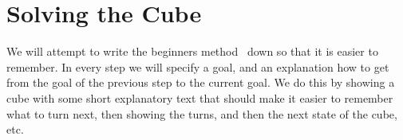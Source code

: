 \chapter{Solving the Cube}
We will attempt to write the beginners method~\cite{youcandothecube} down so that it is easier to remember.
In every step we will specify a goal, and an explanation how to get from the goal of the previous step to the current goal.
We do this by showing a cube with some short explanatory text that should make it easier to remember what to turn next, then showing the turns, and then the next state of the cube, etc.


